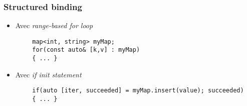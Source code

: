 \documentclass[C++.tex]{subfiles}
\begin{document}
\begin{frame}[fragile]
	\frametitle{Structured binding}
	\begin{itemize}
		\item Avec \textit{range-based for loop}
	\end{itemize}

	\begin{verbatim}
		map<int, string> myMap;
		for(const auto& [k,v] : myMap)
		{ ... }
	\end{verbatim}

	\begin{itemize}
		\item Avec \textit{if init statement}
	\end{itemize}

	\begin{verbatim}
		if(auto [iter, succeeded] = myMap.insert(value); succeeded)
		{ ... }
	\end{verbatim}


\end{frame}
\end{document}

